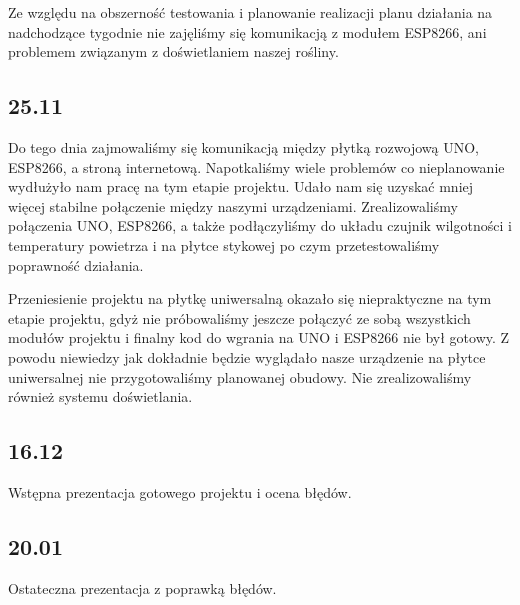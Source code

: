 \documentclass[12pt]{article}
\begin{document}
Ze względu na obszerność testowania i planowanie realizacji planu działania na nadchodzące tygodnie nie zajęliśmy się komunikacją z modułem ESP8266, ani problemem związanym z doświetlaniem naszej rośliny.


\subsection{25.11}
Do tego dnia zajmowaliśmy się komunikacją między płytką rozwojową UNO, ESP8266, a stroną internetową. Napotkaliśmy wiele problemów co nieplanowanie wydłużyło nam pracę na tym etapie projektu. Udało nam się uzyskać mniej więcej stabilne połączenie między naszymi urządzeniami. Zrealizowaliśmy połączenia UNO, ESP8266, a także podłączyliśmy do układu czujnik wilgotności i temperatury powietrza i na płytce stykowej po czym przetestowaliśmy poprawność działania. 

Przeniesienie projektu na płytkę uniwersalną okazało się niepraktyczne na tym etapie projektu, gdyż nie próbowaliśmy jeszcze połączyć ze sobą wszystkich modułów projektu i finalny kod do wgrania na UNO i ESP8266 nie był gotowy. Z powodu niewiedzy jak dokładnie będzie wyglądało nasze urządzenie na płytce uniwersalnej nie przygotowaliśmy planowanej obudowy. Nie zrealizowaliśmy również systemu doświetlania.

\subsection{16.12}
Wstępna prezentacja gotowego projektu i ocena błędów.

\subsection{20.01}
Ostateczna prezentacja z poprawką błędów.
\end{document}

